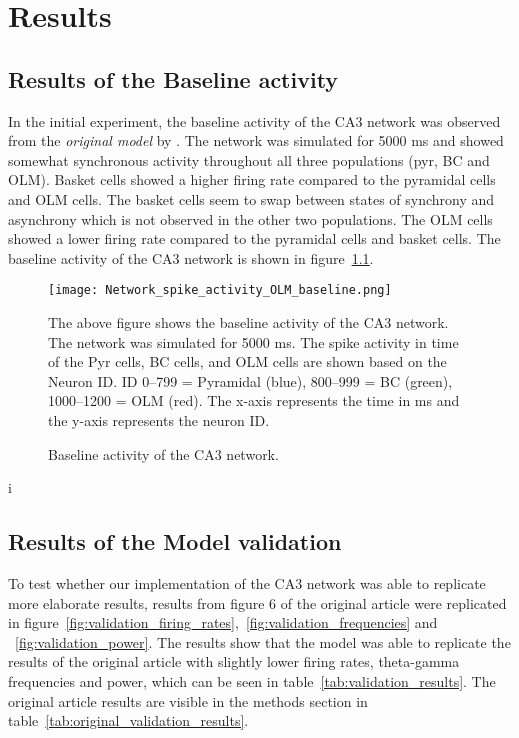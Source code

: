 \chapter{Results}


\section{Results of the Baseline activity}
In the initial experiment, the baseline activity of the CA3 network was
observed from the \textit{original model} by
\textcite{sanjayImpairedDendriticInhibition2015}. The network was simulated for
5000 ms and showed somewhat synchronous activity throughout all three
populations (pyr, BC and OLM). Basket cells showed a higher firing rate
compared to the pyramidal cells and OLM cells. The basket cells seem to swap
between states of synchrony and asynchrony which is not observed in the other
two populations. The OLM cells showed a lower firing rate compared to the
pyramidal cells and basket cells. The baseline activity of the CA3 network is
shown in figure~\ref{fig:baseline_activity}.

\begin{figure}[htbp]
    \centering
    \texttt{[image: Network\_spike\_activity\_OLM\_baseline.png]}
    \caption[Baseline activity of the CA3 network]{Baseline activity of the CA3 network.}\label{fig:baseline_activity}
    \begin{minipage}{0.9\textwidth}
        The above figure shows the baseline activity of the CA3 network. The network was simulated for 5000 ms. The spike activity in time of the Pyr cells, BC cells, and OLM cells are shown based on the Neuron ID\@. ID 0--799 = Pyramidal (blue), 800--999 = BC (green), 1000--1200 = OLM (red). The x-axis represents the time in ms and the y-axis represents the neuron ID\@.
    \end{minipage}
\end{figure}i 

\section{Results of the Model validation}
To test whether our implementation of the CA3 network was able to replicate
more elaborate results, results from figure 6 of the original
\textcite{sanjayImpairedDendriticInhibition2015} article were replicated in
figure~\ref{fig:validation_firing_rates},~\ref{fig:validation_frequencies} and
~\ref{fig:validation_power}. The results show that the model was able to
replicate the results of the original article with slightly lower firing rates,
theta-gamma frequencies and power, which can be seen in
table~\ref{tab:validation_results}. The original article results are visible in
the methods section in table~\ref{tab:original_validation_results}.


